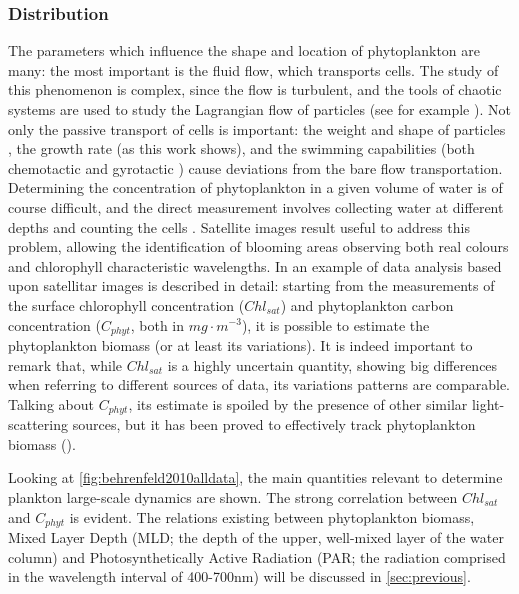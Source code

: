 \subsubsection{Distribution} \label{sec:distribution}
The parameters which influence the shape and location of phytoplankton are many: the most important is the fluid flow, which transports cells. The study of this phenomenon is complex, since the flow is turbulent, and the tools of chaotic systems are used to study the Lagrangian flow of particles (see for example \autocite{hernandez2010chemical}). Not only the passive transport of cells is important: the weight and shape of particles \autocite{Toschi2009LagrangianTurbulence}, the growth rate (as this work shows), and the swimming capabilities (both chemotactic \autocite{Taylor2012Trade-offsWater} and gyrotactic \autocite{DeLillo2014TurbulentMicroorganisms,Durham2013TurbulencePhytoplankton}) cause deviations from the bare flow transportation.
Determining the concentration of phytoplankton in a given volume of water is of course difficult, and the direct measurement involves collecting water at different depths and counting the cells \autocite{Sverdrup1953OnPhytoplankton}. Satellite images result useful to address this problem, allowing the identification of blooming areas observing both real colours and chlorophyll characteristic wavelengths. In \autocite{Behrenfeld2010AbandoningBlooms} an example of data analysis based upon satellitar images is described in detail: starting from the measurements of the surface chlorophyll concentration ($Chl_{sat}$) and phytoplankton carbon concentration ($C_{phyt}$, both in $mg\cdot m^{-3}$), it is possible to estimate the phytoplankton biomass (or at least its variations). It is indeed important to remark that, while $Chl_{sat}$ is a highly uncertain quantity, showing big differences when referring to different sources of data, its variations patterns are comparable. Talking about $C_{phyt}$, its estimate is spoiled by the presence of other similar light-scattering sources, but it has been proved to effectively track phytoplankton biomass (\autocite{Behrenfeld2005Carbon-basedSpace}). 

Looking at \autoref{fig:behrenfeld2010alldata}, the main quantities relevant to determine plankton large-scale dynamics are shown. The strong correlation between $Chl_{sat}$ and $C_{phyt}$ is evident. The relations existing between phytoplankton biomass, Mixed Layer Depth (MLD; the depth of the upper, well-mixed layer of the water column) and Photosynthetically Active Radiation (PAR; the radiation comprised in the wavelength interval of 400-700nm) will be discussed in \autoref{sec:previous}.


